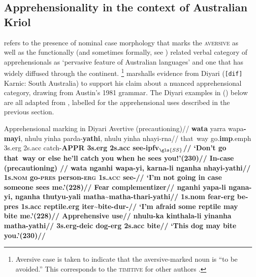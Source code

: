 \subsection{Apprehensionality in the context of Australian Kriol}



\citet[171]{Dixon2002a} refers to the presence of nominal case morphology that marks the \textsc{aversive} as well as the functionally (and sometimes formally, see \citealp[44]{Blake1993}) related verbal category of apprehensionals as `pervasive feature of Australian languages' and one that has widely diffused through the continent.%
\footnote{Aversive case is taken to indicate that the aversive-marked noun is ``to be avoided.'' This corresponds to the \textsc{timitive} for other authors \citep[\textit{e.g.},][]{Vuillermet2018,AnderBois2020}.} \citet[306]{Lichtenberk1995} marshalls evidence from Diyari (\texttt{[dif]} Karnic: South Australia) to support his claim about a nuanced apprehensional category, drawing from Austin's 1981 grammar. The Diyari examples in (\nextx) below are all adapted from \citet{Austin2011}, labelled for the apprehensional uses described in the previous section.

\pex Apprehensional marking in Diyari \a\begingl\glpreamble Avertive (precautioning)//
\gla \textbf{wata} yarra wapa\textbf{-mayi}, nhulu yinha parda-\textbf{yathi}, nhulu yinha nhayi-rna//
 that~way go.\textbf{\gls{imp}}.\gls{emph} 3s{\sc.erg} 2s{\sc.acc} catch-\bfseries{{\footnotesize APPR}} 3s{\sc.erg} 2s{\sc.acc} see-{\sc ipfv$_{\gls{SS}}$}//
\glft `Don't go that~way or else he'll catch you when he sees you!'\hfill(230)//
\endgl
\a\begingl\glpreamble In-case (precautioning) //
\gla \textbf{wata} nganhi wapa-yi, karna-li nganha nhayi-\textbf{yathi}//
 1s\textsc{.nom} go\textsc{-pres} person-\textsc{erg} 1s\textsc{.acc} see-{}//
\glft ‘I’m not going in case someone sees me.’\hfill(228)//
\endgl
\a\begingl\glpreamble Fear complementizer//
\gla nganhi \textbf{yapa}-li ngana-yi, nganha thutyu-yali matha\textasciitilde{}matha-thari-\textbf{yathi}//
\glb 1s{\sc.nom} \textbf{fear}{\sc-erg} be{\sc-pres} 1s{\sc.acc} reptile{\sc.erg} \gls{iter}\textasciitilde{}bite-\gls{dur}-//
\glft `I'm afraid some reptile may bite me.'\hfill(228)//\endgl
\a\begingl\glpreamble Apprehensive use//
\gla nhulu-ka kinthala-li yinanha matha-\textbf{yathi}//
\glb 3s.\gls{erg}-\gls{deic} dog{\sc-erg} 2s{\sc.acc} bite//
\glft `This dog may bite you.'\hfill(230)//
\endgl
\xe

